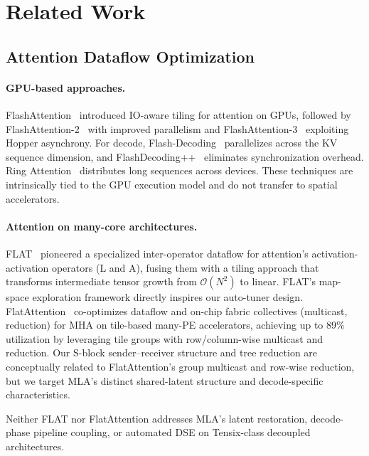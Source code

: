 \documentclass[sigconf, review, anonymous]{acmart}
\newcommand{\SblockName}{S-block}
\newcommand{\autoTuner}{auto-tuner}
\begin{document}
\section{Related Work}\label{sec:related}



\subsection{Attention Dataflow Optimization}\label{sec:rw-attn}

\paragraph{GPU-based approaches.}
FlashAttention~\cite{dao2022flashattention} introduced IO-aware tiling
for attention on GPUs, followed by
FlashAttention-2~\cite{dao2023flashattention2} with improved
parallelism and FlashAttention-3~\cite{shah2024flashattention3}
exploiting Hopper asynchrony.
For decode, Flash-Decoding~\cite{flashdecoding2023} parallelizes
across the KV sequence dimension, and
FlashDecoding++~\cite{hong2024flashdecoding} eliminates synchronization
overhead.  Ring Attention~\cite{liu2023ringattention} distributes long
sequences across devices.  These techniques are intrinsically tied to
the GPU execution model and do not transfer to spatial accelerators.

\paragraph{Attention on many-core architectures.}
FLAT~\cite{kao2023flat} pioneered a specialized inter-operator dataflow
for attention's activation-activation operators (L and A), fusing them
with a tiling approach that transforms intermediate tensor growth from
$\mathcal{O}(N^2)$ to linear.  FLAT's map-space exploration framework
directly inspires our \autoTuner{} design.
FlatAttention~\cite{flatattention2024} co-optimizes dataflow and
on-chip fabric collectives (multicast, reduction) for MHA on tile-based
many-PE accelerators, achieving up to 89\% utilization by leveraging
tile groups with row/column-wise multicast and reduction.  Our
\SblockName{} sender--receiver structure and tree reduction are conceptually
related to FlatAttention's group multicast and row-wise reduction, but
we target MLA's distinct shared-latent structure and decode-specific
characteristics.

Neither FLAT nor FlatAttention addresses MLA's latent restoration,
decode-phase pipeline coupling, or automated DSE on Tensix-class
decoupled architectures.
\end{document}
